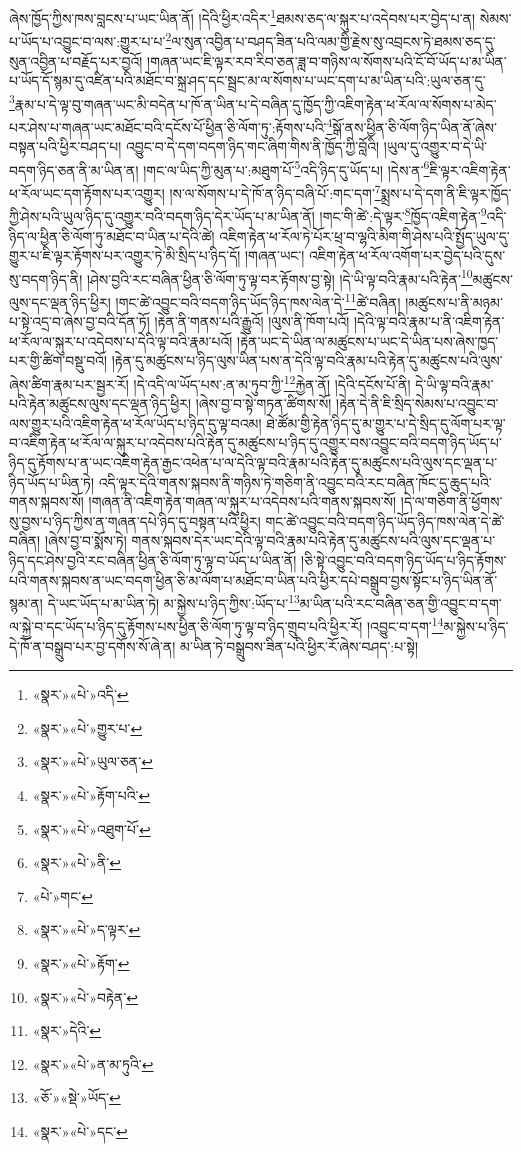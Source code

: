 ཞེས་ཁྱོད་ཀྱིས་ཁས་བླངས་པ་ཡང་ཡིན་ནོ། །དེའི་ཕྱིར་འདིར་\footnote{«སྣར་»«པེ་»འདི་}ཐམས་ཅད་ལ་སྐུར་པ་འདེབས་པར་བྱེད་པ་ན། སེམས་པ་ཡོད་པ་འབྱུང་བ་ལས་:གྱུར་པ་པ་\footnote{«སྣར་»«པེ་»གྱུར་པ་}ལ་སུན་འབྱིན་པ་བཤད་ཟིན་པའི་ལམ་གྱི་རྗེས་སུ་འབྲངས་ཏེ་ཐམས་ཅད་དུ་སུན་འབྱིན་པ་བརྗོད་པར་བྱའོ། །གཞན་ཡང་ཇི་ལྟར་རབ་རིབ་ཅན་ཟླ་བ་གཉིས་ལ་སོགས་པའི་ངོ་བོ་ཡོད་པ་མ་ཡིན་པ་ཡོད་དོ་སྙམ་དུ་འཛིན་པའི་མཐོང་བ་སྐྲ་ཤད་དང་སྦྲང་མ་ལ་སོགས་པ་ཡང་དག་པ་མ་ཡིན་པའི་:ཡུལ་ཅན་དུ་\footnote{«སྣར་»«པེ་»ཡུལ་ཅན་}རྣམ་པ་དེ་ལྟ་བུ་གཞན་ཡང་མི་བདེན་པ་ཁོ་ན་ཡིན་པ་དེ་བཞིན་དུ་ཁྱོད་ཀྱི་འཇིག་རྟེན་ཕ་རོལ་ལ་སོགས་པ་མེད་པར་ཤེས་པ་གཞན་ཡང་མཐོང་བའི་དངོས་པོ་ཕྱིན་ཅི་ལོག་ཏུ་:རྟོགས་པའི་\footnote{«སྣར་»«པེ་»རྟོག་པའི་}སྒོ་ནས་ཕྱིན་ཅི་ལོག་ཉིད་ཡིན་ནོ་ཞེས་བསྟན་པའི་ཕྱིར་བཤད་པ། འབྱུང་བ་དེ་དག་བདག་ཉིད་གང་ཞིག་གིས་ནི་ཁྱོད་ཀྱི་བློའི། །ཡུལ་དུ་འགྱུར་བ་དེ་ཡི་བདག་ཉིད་ཅན་ནི་མ་ཡིན་ན། །གང་ལ་ཡིད་ཀྱི་མུན་པ་:མཐུག་པོ་\footnote{«སྣར་»«པེ་»འཐུག་པོ་}འདི་ཉིད་དུ་ཡོད་པ། །དེས་ན་\footnote{«སྣར་»«པེ་»ནི་}ཇི་ལྟར་འཇིག་རྟེན་ཕ་རོལ་ཡང་དག་རྟོགས་པར་འགྱུར། །ས་ལ་སོགས་པ་དེ་ཁོ་ན་ཉིད་བཞི་པོ་:གང་དག་\footnote{«པེ་»གང་}སྨྲས་པ་དེ་དག་ནི་ཇི་ལྟར་ཁྱོད་ཀྱི་ཤེས་པའི་ཡུལ་ཉིད་དུ་འགྱུར་བའི་བདག་ཉིད་དེར་ཡོད་པ་མ་ཡིན་ནོ། །གང་གི་ཚེ་:དེ་ལྟར་\footnote{«སྣར་»«པེ་»ད་ལྟར་}ཁྱོད་འཇིག་རྟེན་\footnote{«སྣར་»«པེ་»རྟོག་}འདི་ཉིད་ལ་ཕྱིན་ཅི་ལོག་ཏུ་མཐོང་བ་ཡིན་པ་དེའི་ཚེ། འཇིག་རྟེན་ཕ་རོལ་ཏེ་པོར་ཕྲ་བ་ལྷའི་མིག་གི་ཤེས་པའི་སྤྱོད་ཡུལ་དུ་གྱུར་པ་ཇི་ལྟར་རྟོགས་པར་འགྱུར་ཏེ་མི་སྲིད་པ་ཉིད་དོ། །གཞན་ཡང་། འཇིག་རྟེན་ཕ་རོལ་འགོག་པར་བྱེད་པའི་དུས་སུ་བདག་ཉིད་ནི། །ཤེས་བྱའི་རང་བཞིན་ཕྱིན་ཅི་ལོག་ཏུ་ལྟ་བར་རྟོགས་བྱ་སྟེ། །དེ་ཡི་ལྟ་བའི་རྣམ་པའི་རྟེན་\footnote{«སྣར་»«པེ་»བརྟེན་}མཚུངས་ལུས་དང་ལྡན་ཉིད་ཕྱིར། །གང་ཚེ་འབྱུང་བའི་བདག་ཉིད་ཡོད་ཉིད་ཁས་ལེན་དེ་\footnote{«སྣར་»དེའི་}ཚེ་བཞིན། །མཚུངས་པ་ནི་མཉམ་པ་སྟེ་འདྲ་བ་ཞེས་བྱ་བའི་དོན་ཏོ། །རྟེན་ནི་གནས་པའི་རྒྱུའོ། །ལུས་ནི་ཁོག་པའོ། །དེའི་ལྟ་བའི་རྣམ་པ་ནི་འཇིག་རྟེན་ཕ་རོལ་ལ་སྐུར་པ་འདེབས་པ་དེའི་ལྟ་བའི་རྣམ་པའོ། །རྟེན་ཡང་དེ་ཡིན་ལ་མཚུངས་པ་ཡང་དེ་ཡིན་པས་ཞེས་ཁྱད་པར་གྱི་ཚིག་བསྡུ་བའོ། །རྟེན་དུ་མཚུངས་པ་ཉིད་ལུས་ཡིན་པས་ན་དེའི་ལྟ་བའི་རྣམ་པའི་རྟེན་དུ་མཚུངས་པའི་ལུས་ཞེས་ཚིག་རྣམ་པར་སྦྱར་རོ། །དེ་འདི་ལ་ཡོད་པས་:ན་མ་ཏུབ་ཀྱི་\footnote{«སྣར་»«པེ་»ན་མ་ཏུའི་}རྐྱེན་ནོ། །དེའི་དངོས་པོ་ནི། དེ་ཡི་ལྟ་བའི་རྣམ་པའི་རྟེན་མཚུངས་ལུས་དང་ལྡན་ཉིད་ཕྱིར། །ཞེས་བྱ་བ་སྟེ་གཏན་ཚིགས་སོ། །རྟེན་དེ་ནི་ཇི་སྲིད་སེམས་པ་འབྱུང་བ་ལས་གྱུར་པའི་འཇིག་རྟེན་ཕ་རོལ་ཡོད་པ་ཉིད་དུ་ལྟ་བའམ། ཐེ་ཚོམ་གྱི་རྟེན་ཉིད་དུ་མ་གྱུར་པ་དེ་སྲིད་དུ་ལོག་པར་ལྟ་བ་འཇིག་རྟེན་ཕ་རོལ་ལ་སྐུར་པ་འདེབས་པའི་རྟེན་དུ་མཚུངས་པ་ཉིད་དུ་འགྱུར་བས་འབྱུང་བའི་བདག་ཉིད་ཡོད་པ་ཉིད་དུ་རྟོགས་པ་ན་ཡང་འཇིག་རྟེན་རྒྱང་འཕེན་པ་ལ་དེའི་ལྟ་བའི་རྣམ་པའི་རྟེན་དུ་མཚུངས་པའི་ལུས་དང་ལྡན་པ་ཉིད་ཡོད་པ་ཡིན་ཏེ། འདི་ལྟར་དེའི་གནས་སྐབས་ནི་གཉིས་ཏེ་གཅིག་ནི་འབྱུང་བའི་རང་བཞིན་ཁོང་དུ་ཆུད་པའི་གནས་སྐབས་སོ། །གཞན་ནི་འཇིག་རྟེན་གཞན་ལ་སྐུར་པ་འདེབས་པའི་གནས་སྐབས་སོ། །དེ་ལ་གཅིག་ནི་ཕྱོགས་སུ་བྱས་པ་ཉིད་ཀྱིས་ན་གཞན་དཔེ་ཉིད་དུ་བསྟན་པའི་ཕྱིར། གང་ཚེ་འབྱུང་བའི་བདག་ཉིད་ཡོད་ཉིད་ཁས་ལེན་དེ་ཚེ་བཞིན། །ཞེས་བྱ་བ་སྨོས་ཏེ། གནས་སྐབས་དེར་ཡང་དེའི་ལྟ་བའི་རྣམ་པའི་རྟེན་དུ་མཚུངས་པའི་ལུས་དང་ལྡན་པ་ཉིད་དང་ཤེས་བྱའི་རང་བཞིན་ཕྱིན་ཅི་ལོག་ཏུ་ལྟ་བ་ཡོད་པ་ཡིན་ནོ། །ཅི་སྟེ་འབྱུང་བའི་བདག་ཉིད་ཡོད་པ་ཉིད་རྟོགས་པའི་གནས་སྐབས་ན་ཡང་བདག་ཕྱིན་ཅི་མ་ལོག་པ་མཐོང་བ་ཡིན་པའི་ཕྱིར་དཔེ་བསྒྲུབ་བྱས་སྟོང་པ་ཉིད་ཡིན་ནོ་སྙམ་ན། དེ་ཡང་ཡོད་པ་མ་ཡིན་ཏེ། མ་སྐྱེས་པ་ཉིད་ཀྱིས་:ཡོད་པ་\footnote{«ཅོ་»«སྡེ་»ཡོད་}མ་ཡིན་པའི་རང་བཞིན་ཅན་གྱི་འབྱུང་བ་དག་ལ་སྐྱེ་བ་དང་ཡོད་པ་ཉིད་དུ་རྟོགས་པས་ཕྱིན་ཅི་ལོག་ཏུ་ལྟ་བ་ཉིད་གྲུབ་པའི་ཕྱིར་རོ། །འབྱུང་བ་དག་\footnote{«སྣར་»«པེ་»དང་}མ་སྐྱེས་པ་ཉིད་དེ་ཁོ་ན་བསྒྲུབ་པར་བྱ་དགོས་སོ་ཞེ་ན། མ་ཡིན་ཏེ་བསྒྲུབས་ཟིན་པའི་ཕྱིར་རོ་ཞེས་བཤད་:པ་སྟེ། 